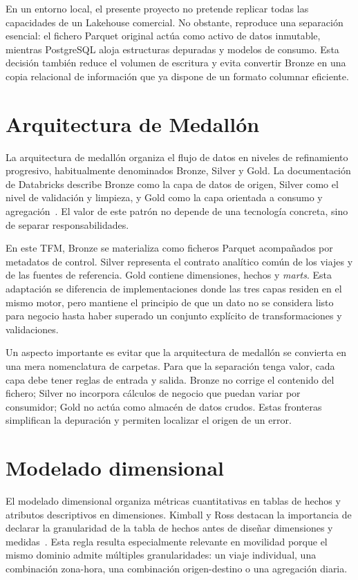 En un entorno local, el presente proyecto no pretende replicar todas las capacidades de un Lakehouse comercial. No obstante, reproduce una separación esencial: el fichero Parquet original actúa como activo de datos inmutable, mientras PostgreSQL aloja estructuras depuradas y modelos de consumo. Esta decisión también reduce el volumen de escritura y evita convertir Bronze en una copia relacional de información que ya dispone de un formato columnar eficiente.

\section{Arquitectura de Medallón}

La arquitectura de medallón organiza el flujo de datos en niveles de refinamiento progresivo, habitualmente denominados Bronze, Silver y Gold. La documentación de Databricks describe Bronze como la capa de datos de origen, Silver como el nivel de validación y limpieza, y Gold como la capa orientada a consumo y agregación~\cite{databricks_medallion}. El valor de este patrón no depende de una tecnología concreta, sino de separar responsabilidades.

En este TFM, Bronze se materializa como ficheros Parquet acompañados por metadatos de control. Silver representa el contrato analítico común de los viajes y de las fuentes de referencia. Gold contiene dimensiones, hechos y \textit{marts}. Esta adaptación se diferencia de implementaciones donde las tres capas residen en el mismo motor, pero mantiene el principio de que un dato no se considera listo para negocio hasta haber superado un conjunto explícito de transformaciones y validaciones.

Un aspecto importante es evitar que la arquitectura de medallón se convierta en una mera nomenclatura de carpetas. Para que la separación tenga valor, cada capa debe tener reglas de entrada y salida. Bronze no corrige el contenido del fichero; Silver no incorpora cálculos de negocio que puedan variar por consumidor; Gold no actúa como almacén de datos crudos. Estas fronteras simplifican la depuración y permiten localizar el origen de un error.

\section{Modelado dimensional}

El modelado dimensional organiza métricas cuantitativas en tablas de hechos y atributos descriptivos en dimensiones. Kimball y Ross destacan la importancia de declarar la granularidad de la tabla de hechos antes de diseñar dimensiones y medidas~\cite{kimball2013}. Esta regla resulta especialmente relevante en movilidad porque el mismo dominio admite múltiples granularidades: un viaje individual, una combinación zona-hora, una combinación origen-destino o una agregación diaria.

